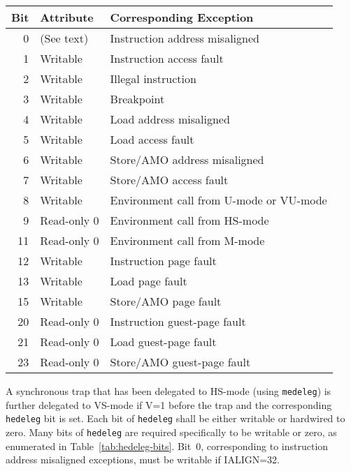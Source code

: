 \begin{table*}[h!]
\begin{center}
\begin{tabular}{|r|l|l|}
\hline
Bit & Attribute   & Corresponding Exception \\
\hline
 0  & (See text)  & Instruction address misaligned \\
 1  & Writable    & Instruction access fault \\
 2  & Writable    & Illegal instruction \\
 3  & Writable    & Breakpoint \\
 4  & Writable    & Load address misaligned \\
 5  & Writable    & Load access fault \\
 6  & Writable    & Store/AMO address misaligned \\
 7  & Writable    & Store/AMO access fault \\
 8  & Writable    & Environment call from U-mode or VU-mode \\
 9  & Read-only 0 & Environment call from HS-mode \\
11  & Read-only 0 & Environment call from M-mode \\
12  & Writable    & Instruction page fault \\
13  & Writable    & Load page fault \\
15  & Writable    & Store/AMO page fault \\
20  & Read-only 0 & Instruction guest-page fault \\
21  & Read-only 0 & Load guest-page fault \\
23  & Read-only 0 & Store/AMO guest-page fault \\
\hline
\end{tabular}
\end{center}
\caption{Bits of {\tt hedeleg} that must be writable or must be hardwired
to zero.}
\label{tab:hedeleg-bits}
\end{table*}

A synchronous trap that has been delegated to HS-mode (using
{\tt medeleg}) is further delegated to VS-mode if V=1 before the trap and
the corresponding {\tt hedeleg} bit is set.
Each bit of {\tt hedeleg} shall be either writable or hardwired to zero.
Many bits of {\tt hedeleg} are required specifically to be writable or
zero, as enumerated in Table~\ref{tab:hedeleg-bits}.
Bit~0, corresponding to instruction address misaligned exceptions, must
be writable if IALIGN=32.

